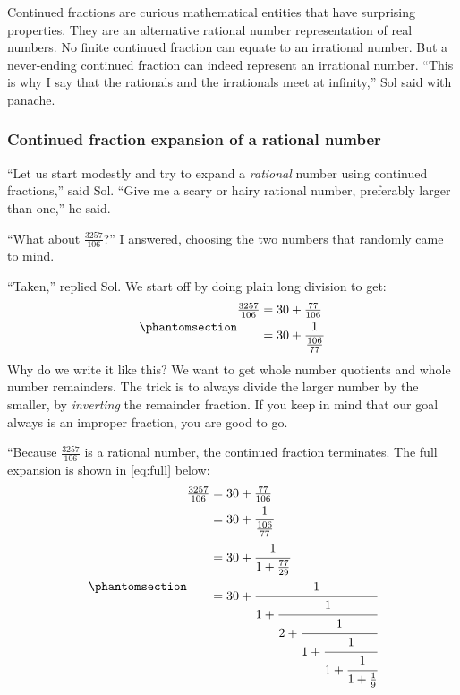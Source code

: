\documentclass[
  a4paper,
]{article}
\begin{document}
Continued fractions are curious mathematical entities that have
surprising properties. They are an alternative rational number
representation of real numbers. No finite continued fraction can equate
to an irrational number. But a never-ending continued fraction can
indeed represent an irrational number. ``This is why I say that the
rationals and the irrationals meet at infinity,'' Sol said with panache.

\subsubsection{Continued fraction expansion of a rational
number}\label{continued-fraction-expansion-of-a-rational-number}

``Let us start modestly and try to expand a \emph{rational} number using
continued fractions,'' said Sol. ``Give me a scary or hairy rational
number, preferably larger than one,'' he said.

``What about \(\frac{3257}{106}\)?'' I answered, choosing the two
numbers that randomly came to mind.

``Taken,'' replied Sol. We start off by doing plain long division to
get: \begin{equation}\phantomsection\label{eq:part}{
\begin{aligned}
\tfrac{3257}{106} &= 30 + \tfrac{77}{106}\\
&= 30 + \frac{1}{\frac{106}{77}}\\
\end{aligned}
}\end{equation} Why do we write it like this? We want to get whole
number quotients and whole number remainders. The trick is to always
divide the larger number by the smaller, by \emph{inverting} the
remainder fraction. If you keep in mind that our goal always is an
improper fraction, you are good to go.

``Because \(\frac{3257}{106}\) is a rational number, the continued
fraction terminates. The full expansion is shown in \cref{eq:full}
below: \begin{equation}\phantomsection\label{eq:full}{
\begin{aligned}
\tfrac{3257}{106} &= 30 + \tfrac{77}{106}\\
&= 30 + \frac{1}{\frac{106}{77}}\\
&= 30 + \cfrac{1}{1 + \tfrac{77}{29}}\\
&= 30 + \cfrac{1}{1 + \cfrac{1}{2 + \cfrac{1}{1 + \cfrac{1}{1 + \cfrac{1}{1 + \tfrac{1}{9}}}}}}
\end{aligned}
}\end{equation}
\end{document}
